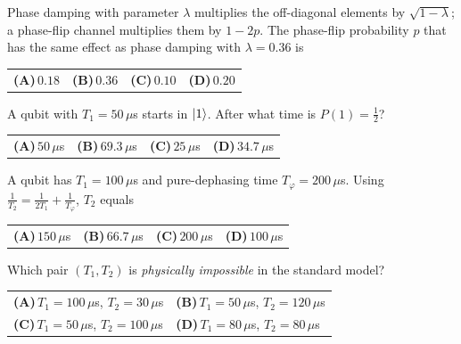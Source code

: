 \documentclass[11pt,a4paper]{article}
\newcommand{\optlabel}[1]{\textbf{(#1)}}
\newenvironment{qitem}[1]{\begin{list}{}{\setlength{\leftmargin}{3.3em}\setlength{\labelwidth}{3.1em}%
  \setlength{\labelsep}{0.2em}\setlength{\topsep}{3pt}\setlength{\parsep}{3pt}}\item[\textbf{Q.#1}\hfill]}{\end{list}}
\newcommand{\qsep}{\par\vspace{2pt}{\color{black!15}\hrule}\vspace{4pt}}
\begin{document}
\begin{qitem}{25}
Phase damping with parameter $\lambda$ multiplies the off-diagonal elements by $\sqrt{1 - \lambda}$; a phase-flip channel multiplies them by $1 - 2p$.
The phase-flip probability $p$ that has the same effect as phase damping with $\lambda = 0.36$ is
\par\smallskip\noindent\begin{tabularx}{\linewidth}{@{}*{4}{L}@{}}
\optlabel{A}\,$0.18$ & \optlabel{B}\,$0.36$ & \optlabel{C}\,$0.10$ & \optlabel{D}\,$0.20$
\end{tabularx}
\end{qitem}
\qsep

\begin{qitem}{26}
A qubit with $T_1 = 50\,\mu$s starts in $\ket1$. After what time is $P(1) = \frac12$?
\par\smallskip\noindent\begin{tabularx}{\linewidth}{@{}*{4}{L}@{}}
\optlabel{A}\,$50\,\mu$s & \optlabel{B}\,$69.3\,\mu$s & \optlabel{C}\,$25\,\mu$s & \optlabel{D}\,$34.7\,\mu$s
\end{tabularx}
\end{qitem}
\qsep

\begin{qitem}{27}
A qubit has $T_1 = 100\,\mu$s and pure-dephasing time $T_\varphi = 200\,\mu$s. Using $\frac{1}{T_2} = \frac{1}{2T_1} + \frac{1}{T_\varphi}$, $T_2$ equals
\par\smallskip\noindent\begin{tabularx}{\linewidth}{@{}*{4}{L}@{}}
\optlabel{A}\,$150\,\mu$s & \optlabel{B}\,$66.7\,\mu$s & \optlabel{C}\,$200\,\mu$s & \optlabel{D}\,$100\,\mu$s
\end{tabularx}
\end{qitem}
\qsep

\begin{qitem}{28}
Which pair $(T_1, T_2)$ is \emph{physically impossible} in the standard model?
\par\smallskip\noindent\begin{tabularx}{\linewidth}{@{}*{2}{L}@{}}
\optlabel{A}\,$T_1 = 100\,\mu$s, $T_2 = 30\,\mu$s & \optlabel{B}\,$T_1 = 50\,\mu$s, $T_2 = 120\,\mu$s \\[3pt]
\optlabel{C}\,$T_1 = 50\,\mu$s, $T_2 = 100\,\mu$s & \optlabel{D}\,$T_1 = 80\,\mu$s, $T_2 = 80\,\mu$s
\end{tabularx}
\end{qitem}
\qsep
\end{document}
